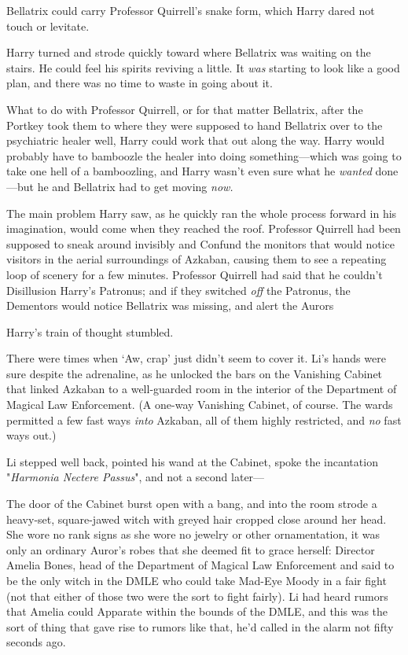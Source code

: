 Bellatrix could carry Professor Quirrell's snake form, which Harry dared not
touch or levitate.

Harry turned and strode quickly toward where Bellatrix was waiting on the
stairs. He could feel his spirits reviving a little. It \emph{was} starting to
look like a good plan, and there was no time to waste in going about it.

What to do with Professor Quirrell, or for that matter Bellatrix, after the
Portkey took them to where they were supposed to hand Bellatrix over to the
psychiatric healer{\el} well, Harry could work that out along the way. Harry
would probably have to bamboozle the healer into doing something---which was
going to take one hell of a bamboozling, and Harry wasn't even sure what he
\emph{wanted} done---but he and Bellatrix had to get moving \emph{now.}

The main problem Harry saw, as he quickly ran the whole process forward in his
imagination, would come when they reached the roof. Professor Quirrell had been
supposed to sneak around invisibly and Confund the monitors that would notice
visitors in the aerial surroundings of Azkaban, causing them to see a repeating
loop of scenery for a few minutes. Professor Quirrell had said that he couldn't
Disillusion Harry's Patronus; and if they switched \emph{off} the Patronus, the
Dementors would notice Bellatrix was missing, and alert the Aurors{\el}

Harry's train of thought stumbled.

There were times when `Aw, crap' just didn't seem to cover it.
\sbreak
Li's hands were sure despite the adrenaline, as he unlocked the bars on the
Vanishing Cabinet that linked Azkaban to a well-guarded room in the interior of
the Department of Magical Law Enforcement. (A one-way Vanishing Cabinet, of
course. The wards permitted a few fast ways \emph{into} Azkaban, all of them
highly restricted, and \emph{no} fast ways out.)

Li stepped well back, pointed his wand at the Cabinet, spoke the incantation
"\emph{Harmonia Nectere Passus}", and not a second later---

The door of the Cabinet burst open with a bang, and into the room strode a
heavy-set, square-jawed witch with greyed hair cropped close around her head.
She wore no rank signs as she wore no jewelry or other ornamentation, it was
only an ordinary Auror's robes that she deemed fit to grace herself: Director
Amelia Bones, head of the Department of Magical Law Enforcement and said to be
the only witch in the DMLE who could take Mad-Eye Moody in a fair fight (not
that either of those two were the sort to fight fairly). Li had heard rumors
that Amelia could Apparate within the bounds of the DMLE, and this was the sort
of thing that gave rise to rumors like that, he'd called in the alarm not fifty
seconds ago.

